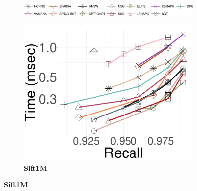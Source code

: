 \newcommand{\soneM}{0.28}
\newcommand{\spbf}{0.13in}
\begin{figure}[!htb]
	\captionsetup{justification=centering}
	\centering
		\begin{subfigure}{\textwidth}
			\includegraphics[width=\textwidth]{../img/Experiments/legendall.png}
		\end{subfigure}	
  
	\captionsetup[subfigure]{justification=centering}
	\begin{subfigure}{\soneM\textwidth}
		\centering
		\includegraphics[width=\textwidth]{../img/Experiments/search/1M/sift_10nn.pdf}
		\caption{\textbf{Sift1M}} 
	

\end{subfigure}
\end{figure}
